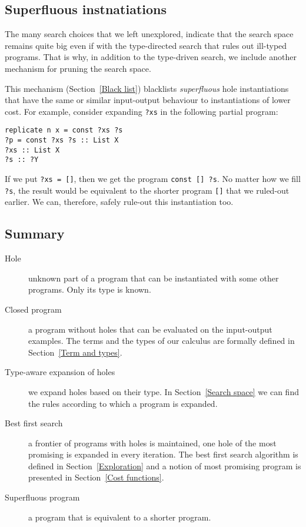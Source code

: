 \subsection{Superfluous instnatiations}
The many search choices that we left unexplored, indicate that the search space remains quite big even if with the type-directed search that rules out ill-typed programs.  That is why, in addition to the type-driven search, we include another mechanism for pruning the search space.

This mechanism (Section~\ref{Black list}) blacklists \emph{superfluous} hole instantiations that have the same or similar input-output behaviour to instantiations of lower cost.  For example, consider expanding \lstinline|?xs| in the following partial program:
\begin{lstlisting}[style=plain]
replicate n x = const ?xs ?s
?p = const ?xs ?s :: List X
?xs :: List X
?s :: ?Y
\end{lstlisting}
If we put \lstinline|?xs = []|, then we get the program \lstinline|const [] ?s|.  No matter how we fill \lstinline|?s|, the result would be equivalent to the shorter program \lstinline|[]| that we ruled-out earlier.  We can, therefore, safely rule-out this instantiation too.

\subsection{Summary}
\begin{description}
\item[Hole] unknown part of a program that can be instantiated with some other programs. Only its type is known.
\item[Closed program] a program without holes that can be evaluated on the input-output examples. The terms and the types of our calculus are formally defined in Section~\ref{Term and types}.
\item[Type-aware expansion of holes] we expand holes based on their type. In Section~\ref{Search space} we can find the rules according to which a program is expanded.
\item[Best first search] a frontier of programs with holes is maintained, one hole of the most promising is expanded in every iteration. The best first search algorithm is defined in Section~\ref{Exploration} and a notion of most promising program is presented in Section~\ref{Cost functions}.
\item[Superfluous program] a program that is equivalent to a shorter program. 
\end{description}

